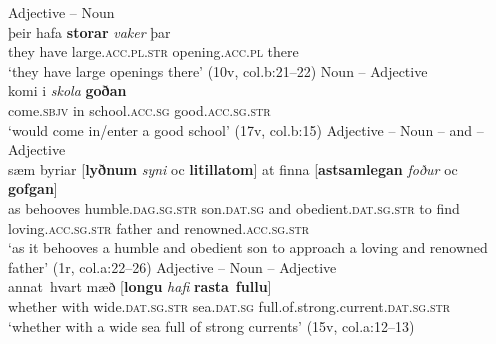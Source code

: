 \documentclass[output=paper,colorlinks,citecolor=brown]{langscibook}
\begin{document}
\begin{exe}
\ex\label{ch8ex1}\begin{xlist}
\ex\label{ch8ex1a} Adjective – Noun\\
\gll þeir hafa \textbf{storar} \textit{vaker} þar \\
they have large.\textsc{acc.pl.str} opening.\textsc{acc.pl} there\\
\glt `they have large openings there' (10v, col.b:21–22)
\ex\label{ch8ex1b} Noun – Adjective\\
\gll komi  i \textit{skola} \textbf{goðan}\\
come.\textsc{sbjv} in school.\textsc{acc.sg} good.\textsc{acc.sg.str}\\
\glt ‘would come in/enter a good school’ (17v, col.b:15)
\ex\label{ch8ex1c} Adjective – Noun – and – Adjective\\
\gll sæm byriar [\textbf{lyðnum} \textit{syni} oc \textbf{litillatom}] at finna [\textbf{astsamlegan} \textit{foður} oc \textbf{gofgan}]\\
as behooves humble.\textsc{dag.sg.str} son.\textsc{dat.sg} and obedient.\textsc{dat.sg.str} to find loving.\textsc{acc.sg.str} father and renowned.\textsc{acc.sg.str}\\
\glt `as it behooves a humble and obedient son to approach a loving and renowned father’ (1r, col.a:22–26)
\ex\label{ch8ex1d} Adjective – Noun – Adjective\\
\gll annat~hvart mæð [\textbf{longu} \textit{hafi} \textbf{rasta}~\textbf{fullu}] \\
whether with wide.\textsc{dat.sg.str} sea.\textsc{dat.sg} full.of.strong.current.\textsc{dat.sg.str}\\
\glt `whether with a wide sea full of strong currents’ (15v, col.a:12–13)

\end{xlist}
\end{exe}
\end{document}
